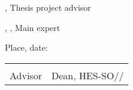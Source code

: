 {\vspace{0.5cm}

\Advisor, Thesis project advisor

\Expert, \ExpertLab, Main expert

\vspace{1cm}

Place, date: \underline{\hspace{8cm}}

\vspace{3cm}

{ \renewcommand{\arraystretch}{1.5}
	\begin{tabularx}{\textwidth}{X X}
		\Advisor & \Dean                  \\ 
		Advisor  & Dean, HES-SO//\Diploma \\
	\end{tabularx}
}
}